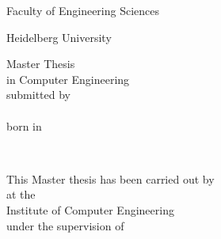 \thispagestyle{empty}
\begin{addmargin}[-1cm]{-3cm}
	\begin{center}
		\begingroup
		\Huge Faculty of Engineering Sciences \\ \medskip
		\endgroup

		\begingroup
		\Large Heidelberg University \\ \bigskip
		\endgroup

		\hfill
		\vfill

		\begingroup
    \Large
		Master Thesis \\
		in Computer Engineering \\
		submitted by \\
		\myName \\
		born in \myPlaceOfBirth \\
		\mySubmissionDate
		\endgroup
	\end{center}
\end{addmargin}

\begin{titlepage}
\begin{addmargin}[-1cm]{-3cm}
	\begin{center}
		\large
		\begingroup
		\huge
		\spacedallcaps{\myTitle} \\ \bigskip
		\endgroup
		\vfill
		\hfill

		This Master thesis has been carried out by \myName \\
		at the \\
		Institute of Computer Engineering \\
		under the supervision of \\
		\myProf
	\end{center}
\end{addmargin}
\end{titlepage}
